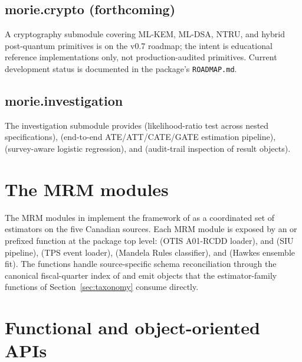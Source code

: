 \documentclass[article,shortnames,nojss]{jss}
\begin{document}
\subsection{morie.crypto (forthcoming)}

A cryptography submodule covering ML-KEM, ML-DSA, NTRU, and
hybrid post-quantum primitives is on the v0.7 roadmap; the
intent is educational reference implementations only, not
production-audited primitives. Current development status is
documented in the package's \texttt{ROADMAP.md}.

\subsection{morie.investigation}

The investigation submodule provides
 (likelihood-ratio test
across nested specifications),
 (end-to-end
ATE/ATT/CATE/GATE estimation pipeline),
 (survey-aware logistic
regression), and  (audit-trail inspection
of result objects).

\section{The MRM modules}
\label{sec:mrm}

The MRM modules in  implement the framework of
\citet{Ruhela2026MRM} as a coordinated set of estimators on the
five Canadian sources. Each MRM module is exposed by an
 or  prefixed function at the package top level:
 (OTIS A01-RCDD loader),
 and
 (SIU pipeline),
 (TPS event loader),
 (Mandela Rules classifier),
and  (Hawkes ensemble fit).
The functions handle source-specific schema reconciliation
through the canonical fiscal-quarter index of
\citet{Ruhela2026MRM} and emit  
objects that the estimator-family functions of
Section~\ref{sec:taxonomy} consume directly.

\section{Functional and object-oriented APIs}
\label{sec:api}
\end{document}
